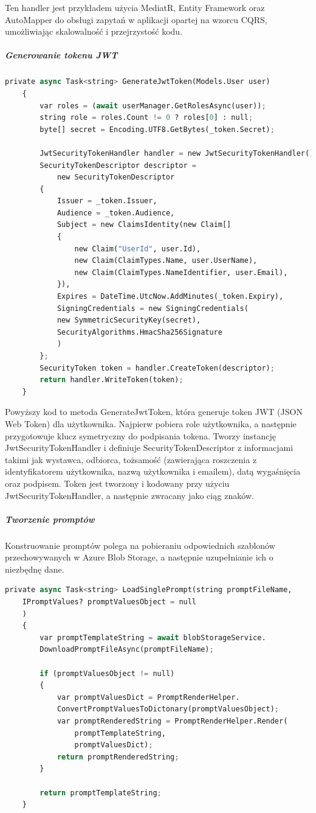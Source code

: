 Ten handler jest przykładem użycia MediatR, Entity Framework oraz AutoMapper do obsługi zapytań w aplikacji opartej na wzorcu CQRS, umożliwiając skalowalność i przejrzystość kodu.
\subparagraph{Generowanie tokenu JWT}
\begin{lstlisting}[language=Python, caption=Generowanie tokenu JWT, linewidth=160mm]
private async Task<string> GenerateJwtToken(Models.User user)
    {
        var roles = (await userManager.GetRolesAsync(user));
        string role = roles.Count != 0 ? roles[0] : null;
        byte[] secret = Encoding.UTF8.GetBytes(_token.Secret);

        JwtSecurityTokenHandler handler = new JwtSecurityTokenHandler();
        SecurityTokenDescriptor descriptor = 
            new SecurityTokenDescriptor
        {
            Issuer = _token.Issuer,
            Audience = _token.Audience,
            Subject = new ClaimsIdentity(new Claim[]
            {
                new Claim("UserId", user.Id),
                new Claim(ClaimTypes.Name, user.UserName),
                new Claim(ClaimTypes.NameIdentifier, user.Email),
            }),
            Expires = DateTime.UtcNow.AddMinutes(_token.Expiry),
            SigningCredentials = new SigningCredentials(
            new SymmetricSecurityKey(secret), 
            SecurityAlgorithms.HmacSha256Signature
            )
        };
        SecurityToken token = handler.CreateToken(descriptor);
        return handler.WriteToken(token);
    }
\end{lstlisting}
Powyższy kod to metoda GenerateJwtToken, która generuje token JWT (JSON Web Token) dla użytkownika. Najpierw pobiera role użytkownika, a następnie przygotowuje klucz symetryczny do podpisania tokena. Tworzy instancję JwtSecurityTokenHandler i definiuje SecurityTokenDescriptor z informacjami takimi jak wystawca, odbiorca, tożsamość (zawierająca roszczenia z identyfikatorem użytkownika, nazwą użytkownika i emailem), datą wygaśnięcia oraz podpisem. Token jest tworzony i kodowany przy użyciu JwtSecurityTokenHandler, a następnie zwracany jako ciąg znaków.
\subparagraph{Tworzenie promptów}
Konstruowanie promptów polega na pobieraniu odpowiednich szablonów przechowywanych w Azure Blob Storage, a następnie uzupełnianie ich o niezbędnę dane.
\begin{lstlisting}[language=Python, caption=Ładowanie promptów, linewidth=160mm]
private async Task<string> LoadSinglePrompt(string promptFileName, 
    IPromptValues? promptValuesObject = null
    )
    {
        var promptTemplateString = await blobStorageService.
        DownloadPromptFileAsync(promptFileName);

        if (promptValuesObject != null)
        {
            var promptValuesDict = PromptRenderHelper.
            ConvertPromptValuesToDictonary(promptValuesObject);
            var promptRenderedString = PromptRenderHelper.Render(
                promptTemplateString, 
                promptValuesDict);
            return promptRenderedString;
        }

        return promptTemplateString;
    }
\end{lstlisting}
